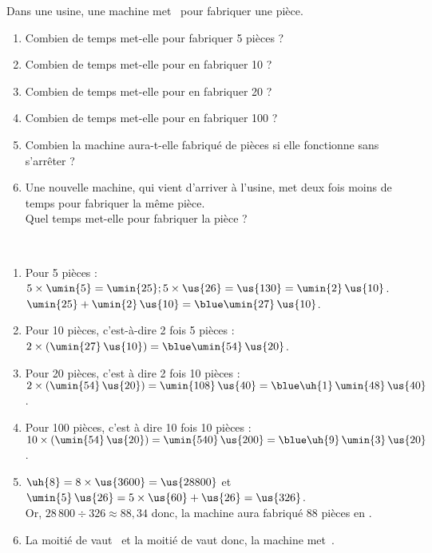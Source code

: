 \begin{colonne*exercice}
\bigskip



\bigskip

\begin{exercice} %
   Dans une usine, une machine met \, pour fabriquer une pièce.
   \begin{enumerate}
      \item Combien de temps met-elle pour fabriquer 5 pièces ?
      \item Combien de temps met-elle pour en fabriquer 10 ?
      \item Combien de temps met-elle pour en fabriquer 20 ?
      \item Combien de temps met-elle pour en fabriquer 100 ?
      \item Combien la machine aura-t-elle fabriqué de pièces si elle fonctionne  sans s’arrêter ?
      \item Une nouvelle machine, qui vient d’arriver à l’usine, met deux fois moins de temps pour fabriquer la même pièce. \\
      Quel temps met-elle pour fabriquer la pièce ?
   \end{enumerate}
\end{exercice}

\begin{corrige}
   \ \\ [-5mm]
   \begin{enumerate}
      \item Pour 5 pièces : \\
         $5\times\umin{5} =\umin{25} ; 5\times\us{26} =\us{130} =\umin{2}\,\us{10}$. \\
         $\umin{25}+\umin{2}\,\us{10} =\blue \umin{27}\,\us{10}$.
      \item Pour 10 pièces, c'est-à-dire 2 fois 5 pièces : \\
         $2\times(\umin{27}\,\us{10}) =\blue \umin{54}\,\us{20}$.
      \item Pour 20 pièces, c'est à dire 2 fois 10 pièces : \\         $2\times(\umin{54}\,\us{20}) =\umin{108}\,\us{40} =\blue \uh{1}\,\umin{48}\,\us{40}$.
      \item Pour 100 pièces, c'est à dire 10 fois 10 pièces : \\
         $10\times(\umin{54}\,\us{20}) =\umin{540}\,\us{200} =\blue \uh{9}\,\umin{3}\,\us{20}$.
      \item $\uh{8} =8\times\us{3600} =\us{28800}$ et \\
         $\umin{5}\,\us{26} =5\times\us{60}+\us{26} =\us{326}$. \\
      Or, $28\,800\div326 \approx88,34$ donc, {\blue la machine aura fabriqué 88 pièces en }.
      \item La moitié de  vaut \, et la moitié de  vaut  donc, {\blue la machine met \,}.
   \end{enumerate}
\end{corrige}


\end{colonne*exercice}
